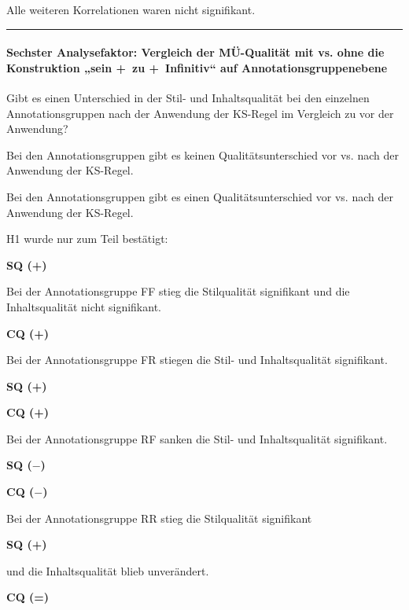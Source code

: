 \medskip
\noindent
\parbox[t]{.7\textwidth}{
Alle weiteren Korrelationen waren nicht signifikant.
}

\hrule
\paragraph*{Sechster Analysefaktor: Vergleich der MÜ-Qualität mit vs. ohne die Konstruktion „sein +~zu +~Infinitiv“ auf Annotationsgruppenebene}
\begin{description}[font=\normalfont\bfseries]
\item [Fragestellung:] Gibt es einen Unterschied in der Stil- und Inhaltsqualität bei den einzelnen Annotationsgruppen nach der Anwendung der KS-Regel im Vergleich zu vor der Anwendung?
\item [H0 --] Bei den Annotationsgruppen gibt es keinen Qualitätsunterschied vor vs. nach der Anwendung der KS-Regel.
\item [H1 --] Bei den Annotationsgruppen gibt es einen Qualitätsunterschied vor vs. nach der Anwendung der KS-Regel.
\item [Resultat]
\end{description}
\noindent
\parbox[t]{.8\textwidth}{H1 wurde nur zum Teil bestätigt:}
\parbox[t]{.04\textwidth}{}
\colorbox{smGreen}{\parbox[t]{.15\textwidth}{
\textbf{SQ (+)}
}}

\noindent
\parbox[t]{.8\textwidth}{
Bei der Annotationsgruppe FF stieg die Stilqualität signifikant und die Inhaltsqualität nicht signifikant.
}
\parbox[t]{.04\textwidth}{}
\parbox[t]{.15\textwidth}{
 \textbf{CQ (+)}
}

\medskip
\noindent
\parbox[t]{.8\textwidth}{
Bei der Annotationsgruppe FR stiegen die Stil- und Inhaltsqualität signifikant.
}
\parbox[t]{.04\textwidth}{}
\colorbox{smGreen}{\parbox[t]{.15\textwidth}{
{ \textbf{SQ (+)}}

\textbf{CQ (+)}
}}

\medskip
\noindent
\parbox[t]{.8\textwidth}{
Bei der Annotationsgruppe RF sanken die Stil- und Inhaltsqualität signifikant.
}
\parbox[t]{.04\textwidth}{}
\colorbox{smGreen}{\parbox[t]{.15\textwidth}{
{ \textbf{SQ ($-$)}}

\textbf{CQ ($-$)}
}}

\medskip
\noindent
\parbox[t]{.8\textwidth}{
Bei der Annotationsgruppe RR stieg die Stilqualität signifikant
}
\parbox[t]{.04\textwidth}{}
\colorbox{smGreen}{\parbox[t]{.15\textwidth}{
\textbf{SQ (+)}
}}

\noindent
\parbox[t]{.8\textwidth}{
und die Inhaltsqualität blieb unverändert.
}
\parbox[t]{.04\textwidth}{}
\parbox[t]{.15\textwidth}{
\textbf{CQ (=)}
}

